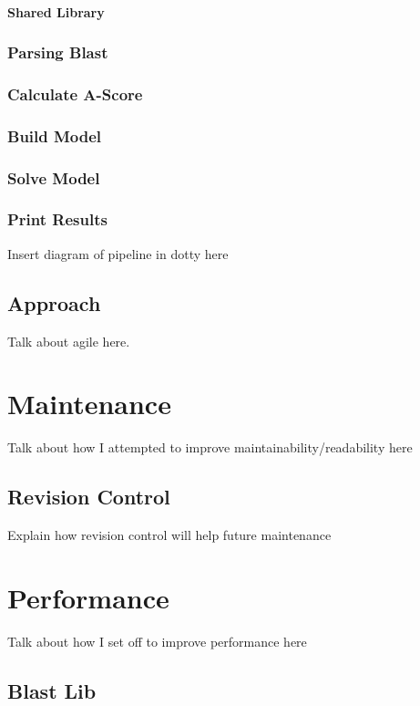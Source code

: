 \subsubsection{Shared Library}

\subsection{Parsing Blast}
\subsection{Calculate A-Score}
\subsection{Build Model}
\subsection{Solve Model}
\subsection{Print Results}

Insert diagram of pipeline in dotty here

\section{Approach}
Talk about agile here.

\chapter{Maintenance}
Talk about how I attempted to improve maintainability/readability here

\section{Revision Control}
Explain how revision control will help future maintenance 

\chapter{Performance}
Talk about how I set off to improve performance here

\section{Blast Lib}